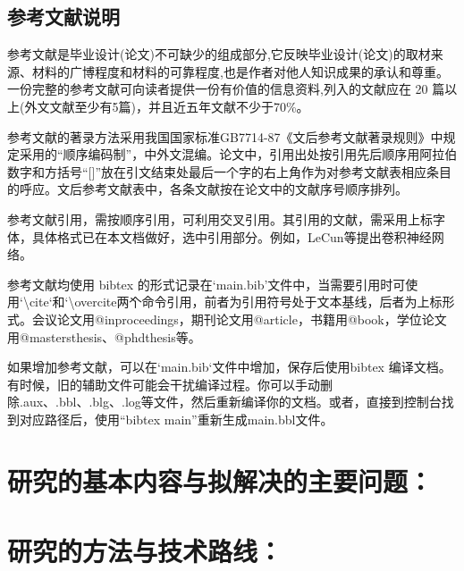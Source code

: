 \documentclass{article}
\begin{document}
\subsection*{参考文献说明}
参考文献是毕业设计(论文)不可缺少的组成部分,它反映毕业设计(论文)的取材来源、材料的广博程度和材料的可靠程度,也是作者对他人知识成果的承认和尊重。一份完整的参考文献可向读者提供一份有价值的信息资料,列入的文献应在 20 篇以上(外文文献至少有5篇)，并且近五年文献不少于70\%。

参考文献的著录方法采用我国国家标准GB7714-87《文后参考文献著录规则》中规定采用的“顺序编码制”，中外文混编。论文中，引用出处按引用先后顺序用阿拉伯数字和方括号“[]”放在引文结束处最后一个字的右上角作为对参考文献表相应条目的呼应。文后参考文献表中，各条文献按在论文中的文献序号顺序排列。

参考文献引用，需按顺序引用，可利用交叉引用。其引用的文献，需采用上标字体，具体格式已在本文档做好，选中引用部分。例如，LeCun等提出卷积神经网络。

参考文献均使用 bibtex 的形式记录在`main.bib'文件中，当需要引用时可使用`\textbackslash cite`和`\textbackslash overcite\`两个命令引用，前者为引用符号处于文本基线，后者为上标形式。会议论文用@inproceedings{}，期刊论文用@article{}，书籍用@book{}，学位论文用@mastersthesis{}、@phdthesis{}等。

如果增加参考文献，可以在`main.bib`文件中增加，保存后使用bibtex
编译文档。有时候，旧的辅助文件可能会干扰编译过程。你可以手动删除.aux、.bbl、.blg、.log等文件，然后重新编译你的文档。或者，直接到控制台找到对应路径后，使用“bibtex main”重新生成main.bbl文件。





\newpage
\section{研究的基本内容与拟解决的主要问题：}





\newpage
\section{研究的方法与技术路线：}
\end{document}
